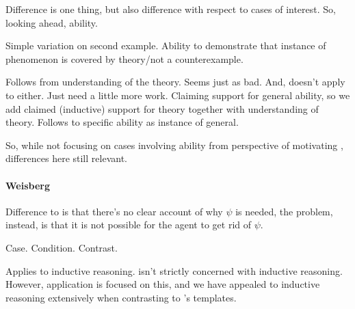 \begin{note}
  \color{later}
  Difference is one thing, but also difference with respect to cases of interest.
  So, looking ahead, ability.

  Simple variation on second example.
  Ability to demonstrate that instance of phenomenon is covered by theory/not a counterexample.

  Follows from understanding of the theory.
  Seems just as bad.
  And, \citeauthor{Wright:2011wn} doesn't apply to either.
  Just need a little more work.
  Claiming support for general ability, so we add claimed (inductive) support for theory together with understanding of theory.
  Follows to specific ability as instance of general.

  So, while not focusing on cases involving ability from perspective of motivating \nI{}, differences here still relevant.
\end{note}

\paragraph{Weisberg}

\begin{note}
  \color{red}
  Difference to \wnf{} is that there's no clear account of why \(\psi\) is needed, the problem, instead, is that it is not possible for the agent to get rid of \(\psi\).
\end{note}

\begin{note}
  Case.
  Condition.
  Contrast.

  Applies to inductive reasoning.
  \nI{} isn't strictly concerned with inductive reasoning.
  However, application is focused on this, and we have appealed to inductive reasoning extensively when contrasting \nI{} to \citeauthor{Wright:2011wn}'s templates.
\end{note}

